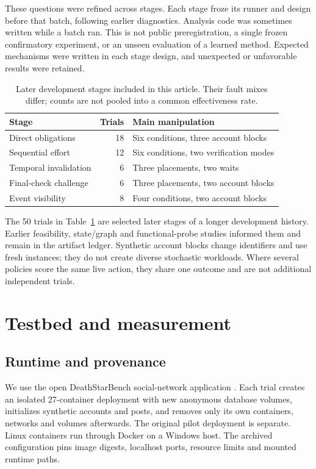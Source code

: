 \documentclass[11pt]{article}
\begin{document}
These questions were refined across stages. Each stage froze its runner and design before that batch, following earlier diagnostics. Analysis code was sometimes written while a batch ran. This is not public preregistration, a single frozen confirmatory experiment, or an unseen evaluation of a learned method. Expected mechanisms were written in each stage design, and unexpected or unfavorable results were retained.

\begin{table}[ht]
\centering\small
\begin{tabular}{lrl}
\toprule Stage & Trials & Main manipulation \\
\midrule
Direct obligations & 18 & Six conditions, three account blocks \\
Sequential effort & 12 & Six conditions, two verification modes \\
Temporal invalidation & 6 & Three placements, two waits \\
Final-check challenge & 6 & Three placements, two account blocks \\
Event visibility & 8 & Four conditions, two account blocks \\
\bottomrule
\end{tabular}
\caption{Later development stages included in this article. Their fault mixes differ; counts are not pooled into a common effectiveness rate.}
\label{tab:stages}
\end{table}

The 50 trials in Table~\ref{tab:stages} are selected later stages of a longer development history. Earlier feasibility, state/graph and functional-probe studies informed them and remain in the artifact ledger. Synthetic account blocks change identifiers and use fresh instances; they do not create diverse stochastic workloads. Where several policies score the same live action, they share one outcome and are not additional independent trials.

\section{Testbed and measurement}
\subsection{Runtime and provenance}
We use the open DeathStarBench social-network application \cite{dsb}. Each trial creates an isolated 27-container deployment with new anonymous database volumes, initializes synthetic accounts and posts, and removes only its own containers, networks and volumes afterwards. The original pilot deployment is separate. Linux containers run through Docker on a Windows host. The archived configuration pins image digests, localhost ports, resource limits and mounted runtime paths.
\end{document}
